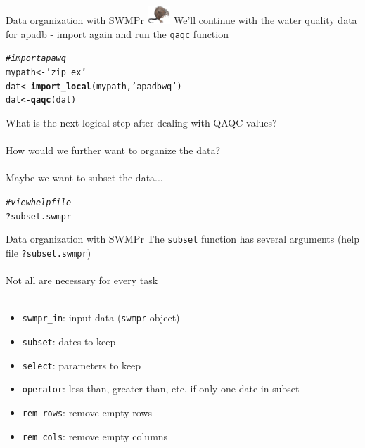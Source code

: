 \documentclass[xcolor=dvipsnames,serif]{beamer}\usepackage[]{graphicx}\usepackage[]{color}
\makeatletter
\newcommand{\hlstr}[1]{\textcolor[rgb]{0.192,0.494,0.8}{#1}}%
\newcommand{\hlcom}[1]{\textcolor[rgb]{0.678,0.584,0.686}{\textit{#1}}}%
\newcommand{\hlopt}[1]{\textcolor[rgb]{0,0,0}{#1}}%
\newcommand{\hlstd}[1]{\textcolor[rgb]{0.345,0.345,0.345}{#1}}%
\newcommand{\hlkwb}[1]{\textcolor[rgb]{0.69,0.353,0.396}{#1}}%
\newcommand{\hlkwd}[1]{\textcolor[rgb]{0.737,0.353,0.396}{\textbf{#1}}}%
\newenvironment{kframe}{%
 \def\at@end@of@kframe{}%
 \ifinner\ifhmode%
  \def\at@end@of@kframe{\end{minipage}}%
  \begin{minipage}{\columnwidth}%
 \fi\fi%
 \def\FrameCommand##1{\hskip\@totalleftmargin \hskip-\fboxsep
 \colorbox{shadecolor}{##1}\hskip-\fboxsep
     \hskip-\linewidth \hskip-\@totalleftmargin \hskip\columnwidth}%
 \MakeFramed {\advance\hsize-\width
   \@totalleftmargin\z@ \linewidth\hsize
   \@setminipage}}%
 {\par\unskip\endMakeFramed%
 \at@end@of@kframe}
\newenvironment{knitrout}{}{} %
\makeatother
\begin{document}
\begin{frame}[fragile]{Data organization with SWMPr \includegraphics[width = 0.065\textwidth]{imgs/swmprat.png}} 
\onslide<+->
We'll continue with the water quality data for apadb - import again and run the \texttt{qaqc} function
\onslide<+->
\begin{knitrout}\scriptsize
{}\color{fgcolor}\begin{kframe}
\begin{alltt}
\hlcom{# import apawq}
\hlstd{mypath} \hlkwb{<-} \hlstr{'zip_ex'}
\hlstd{dat} \hlkwb{<-} \hlkwd{import_local}\hlstd{(mypath,} \hlstr{'apadbwq'}\hlstd{)}
\hlstd{dat} \hlkwb{<-} \hlkwd{qaqc}\hlstd{(dat)}
\end{alltt}
\end{kframe}
\end{knitrout}
\onslide<+->
What is the next logical step after dealing with QAQC values? \\~\\
How would we further want to organize the data? \\~\\
\onslide<+->
Maybe we want to subset the data... 
\begin{knitrout}\scriptsize
{}\color{fgcolor}\begin{kframe}
\begin{alltt}
\hlcom{# view help file}
\hlopt{?}\hlstd{subset.swmpr}
\end{alltt}
\end{kframe}
\end{knitrout}
\end{frame}

\begin{frame}[fragile]{Data organization with SWMPr}
The \texttt{subset} function has several arguments (help file \texttt{?subset.swmpr})\\~\\
Not all are necessary for every task \\~\\
\begin{itemize}
\item \texttt{swmpr\_in}: input data (\texttt{swmpr} object)
\item \texttt{subset}: dates to keep
\item \texttt{select}: parameters to keep
\item \texttt{operator}: less than, greater than, etc. if only one date in subset
\item \texttt{rem\_rows}: remove empty rows
\item \texttt{rem\_cols}: remove empty columns \\~\\
\end{itemize}
\end{frame}
\end{document}
